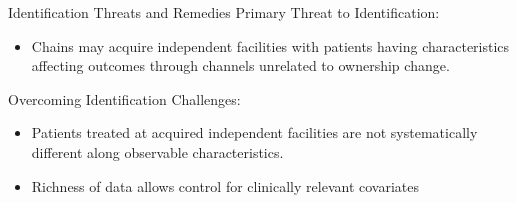\begin{frame}{Identification Threats and Remedies}
Primary Threat to Identification:
\begin{itemize}
    \item Chains may acquire independent facilities with patients having characteristics affecting outcomes through channels unrelated to ownership change.
\end{itemize}

Overcoming Identification Challenges:
\begin{itemize}
    \item Patients treated at acquired independent facilities are not systematically different along observable characteristics.
    \item Richness of data allows control for clinically relevant covariates
\end{itemize}
\end{frame}